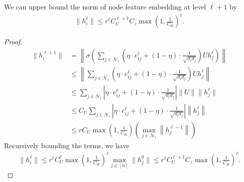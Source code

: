 \begin{lemma}
    We can upper bound the norm of node feature embedding at level $\ell+1$ by
    \begin{align*}
         \|h_i^\ell\|
        \leq r^\ell C_U^{\ell+1} C_z \max\left(1, \frac{1}{C_{dl}}\right)^\ell.
    \end{align*}
\end{lemma}
\begin{proof}
    \begin{align*}
        \|h_i^{\ell+1}\|
        &= \left\|\sigma \left(\sum_{j \in \mathcal{N}_i} (\eta \cdot e_{ij}^{\ell} + (1 - \eta) \cdot \frac{1}{\sqrt{d_i d_j }} )  U  h_j^{\ell} \right)\right\|\\
        &\leq \left\|\sum_{j \in \mathcal{N}_i} (\eta \cdot e_{ij}^{\ell} + (1 - \eta) \cdot \frac{1}{\sqrt{d_i d_j }} )  U  h_j^{\ell} \right\|
        \tag{since $\|\sigma(x)\| \leq \|x\|$}\\
        &\leq \sum_{j \in \mathcal{N}_i} \left|\eta \cdot e_{ij}^{\ell} + (1 - \eta) \cdot \frac{1}{\sqrt{d_i d_j }} \right| \| U\|  \|h_j^{\ell} \|
        \tag{by triangle inequality and Cauchy-Schwarz inequality}\\
        &\leq C_U  \sum_{j \in \mathcal{N}_i} \left|\eta \cdot e_{ij}^{\ell} + (1 - \eta) \cdot \frac{1}{\sqrt{d_i d_j }} \right| \left\|h_j^{\ell} \right\|\\
        &\leq r C_U \max\left(1, \frac{1}{C_{dl}}\right)\left(\max_{j \in \mathcal{N}_i}\left\|h_j^{\ell-1}\right\|\right)
    \end{align*}
    Recursively bounding the terms, we have 
    \begin{align*}
        \|h_i^\ell\| \leq r^\ell C_U^\ell \max\left(1, \frac{1}{C_{dl}}\right)^\ell \max_{j \in [n]}\|h_j^0\|
        \leq r^\ell C_U^{\ell+1} C_z \max\left(1, \frac{1}{C_{dl}}\right)^\ell.
    \end{align*}
\end{proof}

